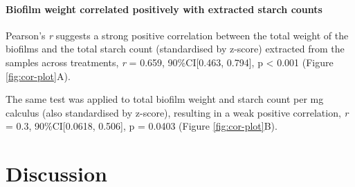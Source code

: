 \documentclass[utf8]{../templates/frontiersSCNS}
\begin{document}
\paragraph{Biofilm weight correlated positively with extracted starch counts}\label{biofilm-weight-correlated-positively-with-extracted-starch-counts}

Pearson's \emph{r} suggests a
strong positive
correlation between the total weight of the biofilms and the total starch count
(standardised by z-score) extracted from the samples across treatments,
\emph{r} = 0.659,
90\%CI{[}0.463, 0.794{]},
p \textless{} 0.001
(Figure \ref{fig:cor-plot}A).

The same test was applied to total biofilm weight and starch count per mg
calculus (also standardised by z-score), resulting in a weak positive correlation,
\emph{r} = 0.3,
90\%CI{[}0.0618, 0.506{]},
p = 0.0403
(Figure \ref{fig:cor-plot}B).

\section{Discussion}\label{discussion}
\end{document}

